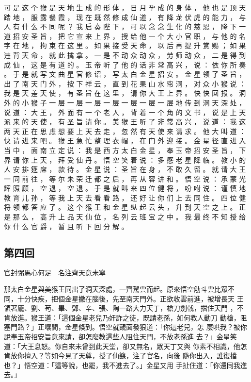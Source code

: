 {可 是 这 个 猴 是 天 地 生 成 的 形 体 ， 日 月 孕 成 的 身 体 ， 他 也 是 顶 天 踏 地 ， 服 露 餐 霞 ， 现 在 既 然 修 成 仙 道 ， 有 降 龙 伏 虎 的 能 力 ， 与 人 有 什 么 不 同 呢 ？ 我 启 奏 陛 下 ， 可 以 念 念 生 化 的 慈 恩 ， 降 下 一 道 招 安 圣 旨 ， 把 它 宣 来 上 界 ， 授 给 他 一 个 大 小 官 职 ， 与 他 的 名 字 在 地 ， 拘 束 在 这 里 。
如 果 接 受 天 命 ， 以 后 再 提 升 赏 赐 ； 如 果 违 背 天 命 ， 就 此 擒 拿 。
一 是 不 动 众 动 众 ， 劳 师 动 众 ， 二 是 得 到 成 仙 ， 这 是 有 道 的 。
玉 帝 听 了 他 的 话 非 常 高 兴 ， 说 ： 依 你 所 奏 。
于 是 就 写 文 曲 星 官 修 诏 ， 写 太 白 金 星 招 安 。
金 星 领 了 圣 旨 ， 出 了 南 天 门 外 ， 按 下 祥 云 ， 直 到 花 果 山 水 帘 洞 ， 对 众 小 猴 说 ： 我 是 天 差 天 使 ， 有 圣 旨 在 这 里 ， 请 你 大 王 上 界 。
快 快 回 报 。
洞 外 的 小 猴 子 一 层 一 层 一 层 一 层 一 层 一 层 一 层 地 传 到 洞 天 深 处 ， 说 道 ： 大 王 ， 外 面 有 一 个 老 人 ， 背 着 一 个 角 的 文 书 ， 说 是 上 天 派 来 的 天 使 ， 有 圣 旨 请 你 。
美 猴 王 听 了 非 常 高 兴 ， 说 道 ： 我 这 两 天 正 在 思 虑 想 要 上 天 去 走 ， 忽 然 有 天 使 来 请 求 。
他 大 叫 道 ： 快 请 进 来 吧 。
猴 王 急 忙 整 理 衣 帽 ， 在 门 外 迎 接 。
金 星 径 直 进 入 当 中 ， 面 南 立 定 说 ： 我 是 西 方 太 白 金 星 ， 奉 玉 帝 招 安 圣 旨 ， 下 界 请 你 上 天 ， 拜 受 仙 丹 。
悟 空 笑 着 说 ： 多 感 老 星 降 临 。
教 小 的 人 安 排 筵 席 ， 款 待 。
金 星 说 ： 圣 旨 在 身 ， 不 敢 久 留 。
就 请 大 王 一 同 前 往 ， 等 尔 朱 荣 迁 都 之 后 ， 再 从 容 讲 和 。
悟 空 说 ： 承 蒙 光 辉 照 顾 ， 空 退 ， 空 退 。
于 是 就 叫 来 四 位 健 将 ， 吩 咐 说 ： 谨 慎 地 教 育 儿 孙 ， 等 我 上 天 去 看 看 路 ， 还 好 让 你 们 上 去 同 住 。
四 位 健 将 领 都 答 应 了 。
这 个 猴 王 和 金 星 纵 起 云 头 ， 升 到 天 空 之 上 。
正 是 那 么 ， 高 升 上 品 天 仙 位 ， 名 列 云 班 宝 之 中 。
我 最 终 不 知 授 给 你 什 么 官 爵 ， 暂 且 听 下 回 分 解 。
}\switchcolumn\flushpage  \begin{pinyinscope}{\myfontt \section{第四回}     官封弼馬心何足　名注齊天意未寧

那太白金星與美猴王同出了洞天深處，一齊駕雲而起。原來悟空觔斗雲比眾不
同，十分快疾，把個金星撇在腦後，先至南天門外。正欲收雲前進，被增長天
王領著龐、劉、苟、畢、鄧、辛、張、陶一路大力天丁，槍刀劍戟，擋住天門
，不肯放進。猴王道：「這個金星老兒乃奸詐之徒，既請老孫，如何教人動刀
動槍，阻塞門路？」正嚷間，金星倏到。悟空就覿面發狠道：「你這老兒，怎
麼哄我？被你說奉玉帝招安旨意來請，卻怎麼教這些人阻住天門，不放老孫進
去？」金星笑道：「大王息怒。你自來未曾到此天堂，卻又無名，眾天丁又與
你素不相識，他怎肯放你擅入？等如今見了天尊，授了仙籙，注了官名，向後
隨你出入，誰復擋也？」悟空道：「這等說，也罷，我不進去了。」金星又用
手扯住道：「你還同我進去。」

}
\end{pinyinscope}
